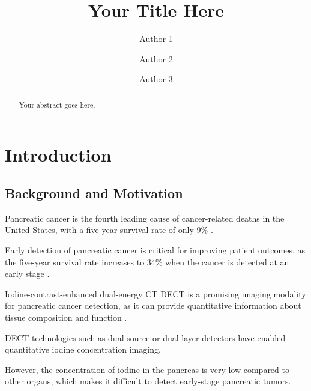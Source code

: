 \documentclass[12pt]{article}
\title{Your Title Here}
\author{Author 1 \and Author 2 \and Author 3}
\date{} %
\begin{document}
\maketitle

\begin{abstract}
    Your abstract goes here.
\end{abstract}

\section{Introduction}
\label{sec:introduction}

\subsection{Background and Motivation}
\label{subsec:intro_Background}



Pancreatic cancer is the fourth leading cause of cancer-related deaths in the United States, with a five-year survival rate of only 9\% \cite{Siegel2019}.


Early detection of pancreatic cancer is critical for improving patient outcomes, as the five-year survival rate increases to 34\% when the cancer is detected at an early stage \cite{Siegel2019}.


Iodine-contrast-enhanced dual-energy CT DECT is a promising imaging modality for pancreatic cancer detection, as it can provide quantitative information about tissue composition and function \cite{Johnson2017}.

DECT technologies such as dual-source or dual-layer detectors have enabled quantitative iodine concentration imaging. 


However, the concentration of iodine in the pancreas is very low compared to other organs, which makes it difficult to detect early-stage pancreatic tumors.

\end{document}
